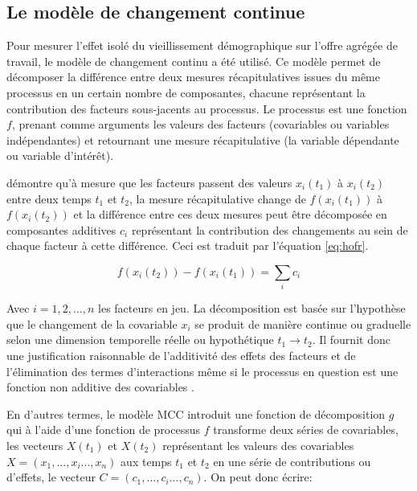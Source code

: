 \subsection{Le modèle de changement continue}
Pour mesurer l’effet isolé du vieillissement démographique sur l’offre agrégée de travail, le modèle de changement continu \citep{horiuchiDecompositionMethodBased2008} a été utilisé.
Ce modèle permet de décomposer la différence entre deux mesures récapitulatives issues du même processus en un certain nombre de composantes, chacune représentant la contribution des facteurs sous-jacents au processus.
Le processus est une fonction \(f \), prenant comme arguments les valeurs des facteurs (covariables ou variables indépendantes) et retournant une mesure récapitulative (la variable dépendante ou variable d'intérêt).

\vspace{0.7em}\par
\citet{horiuchiDecompositionMethodBased2008} démontre qu’à mesure que les facteurs passent des valeurs \(x_i(t_1) \) à \(x_i(t_2) \) entre deux temps \(t_1 \) et \(t_2 \), la mesure récapitulative change de \(f(x_i(t_1) )\) à \(f(x_i(t_2) )\) et la différence entre ces deux mesures peut être décomposée en composantes additives \( c_{i} \) représentant la contribution des changements au sein de chaque facteur à cette différence.
Ceci est traduit par l'équation \eqref{eq:hofr}.

\begin{equation} \label{eq:hofr}
  f(x_i(t_2)) - f(x_i(t_1)) = \displaystyle\sum_ {i}c_{i}
\end{equation}

\vspace{0.7em}\par
Avec \( i = 1, 2, . . . , n \) les facteurs en jeu.
La décomposition est basée sur l'hypothèse que le changement de la covariable \(x_i \) se produit de manière continue ou graduelle selon une dimension temporelle réelle ou hypothétique \(t_1 \rightarrow t_2 \).
Il fournit donc une justification raisonnable de l'additivité des effets des facteurs et de l'élimination des termes d'interactions même si le processus en question est une fonction non additive des covariables \citep[p.~786]{horiuchiDecompositionMethodBased2008}.

\vspace{0.7em}\par
En d'autres termes, le modèle MCC introduit une fonction de décomposition \(g \) qui à l'aide d'une fonction de processus \(f \) transforme deux séries de covariables, les vecteurs  \(X(t_1) \) et \(X(t_2)  \) représentant les valeurs des covariables \(X = (x_1,...,x_i...,x_n) \) aux temps \(t_1 \) et \(t_2 \) en une série de contributions ou d'effets, le vecteur \( C = (c_1,...,c_i...,c_n) \).
On peut donc écrire:

